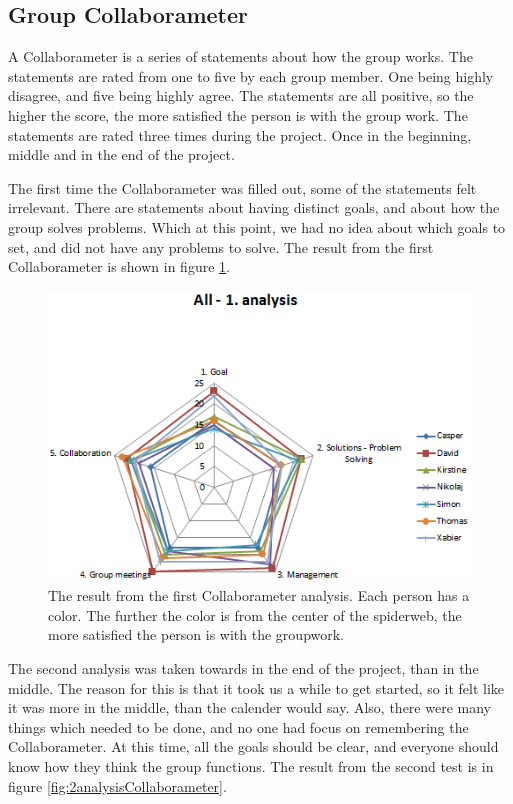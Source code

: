 \subsection{Group Collaborameter}
A Collaborameter is a series of statements about how the group works. The statements are rated from one to five by each group member. One being highly disagree, and five being highly agree. The statements are all positive, so the higher the score, the more satisfied the person is with the group work. The statements are rated three times during the project. Once in the beginning, middle and in the end of the project. 

The first time the Collaborameter was filled out, some of the statements felt irrelevant. There are statements about having distinct goals, and about how the group solves problems. Which at this point, we had no idea about which goals to set, and did not have any problems to solve. The result from the first Collaborameter is shown in figure \ref{fig:1analysisCollaborameter}.

\begin{figure}[h]
\centering
\includegraphics[width=0.6\linewidth]{graphics/1analysisCollaborameter}
\caption[Result from first Collaborameter analysis]{The result from the first Collaborameter analysis. Each person has a color. The further the color is from the center of the spiderweb, the more satisfied the person is with the groupwork.}
\label{fig:1analysisCollaborameter}
\end{figure}


The second analysis was taken towards in the end of the project, than in the middle. The reason for this is that it took us a while to get started, so it felt like it was more in the middle, than the calender would say. Also, there were many things which needed to be done, and no one had focus on remembering the Collaborameter. At this time, all the goals should be clear, and everyone should know how they think the group functions. The result from the second test is in figure \ref{fig:2analysisCollaborameter}.


